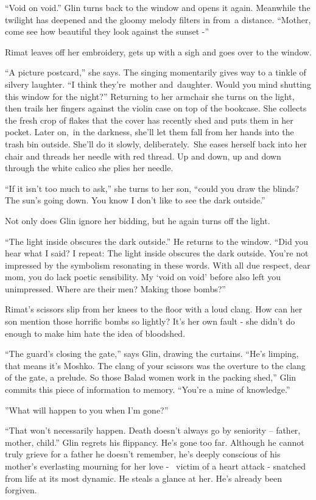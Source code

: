 \documentclass[twoside,11pt]{book}
\begin{document}
``Void on void.'' Glin turns back to the window and opens it
again. Meanwhile the twilight has deepened and the gloomy melody
filters in from~a distance. ``Mother, come see how beautiful they look
against the sunset -''

Rimat leaves off her embroidery, gets up with a sigh and goes over to
the window. 

``A picture postcard,'' she says. The singing momentarily gives way
to a tinkle of silvery laughter. ``I think they're~mother and~daughter. Would you mind shutting this window for the
night?'' Returning
to her armchair she turns on the light, then trails her fingers
against the violin case on top
of the bookcase. She
collects the fresh crop of flakes that the cover has recently shed and
puts them in her pocket. Later on,~in the darkness,
she'll let them fall from her hands into the trash bin
outside. She'll do it slowly, deliberately.~She eases herself back
into her chair and threads her needle with red thread. Up and down, up and down through the white calico she
plies her needle.

``If it isn't
too much to ask,'' she turns to her son,
``could you draw the blinds? The sun's going
down. You know I don't like to see the dark
outside.''

Not only does Glin
ignore her bidding, but he again turns off the light. 

``The light inside obscures
the dark outside.'' He returns to the window. ``Did you hear what I
said? I repeat: The light
inside obscures the dark outside. You're not impressed by the
symbolism resonating in these words. With all due respect, dear mom,
you do lack poetic sensibility. My `void on void' before also left
you unimpressed. Where are their men?
Making those bombs?''

Rimat's scissors slip from her knees to the floor with a loud clang. How can her son mention those horrific bombs so
lightly? It's her own fault - she didn't do enough to make him hate the idea of bloodshed.

``The guard's closing the gate,'' says Glin, drawing the curtains. ``He's limping, that means it's Moshko. The clang
of your scissors was the overture to the clang of the gate, a prelude. So those Balad women work in the packing shed,''
Glin commits this piece of information to memory. ``You're a mine of knowledge.''

''What will happen to you when I'm gone?''

``That won't necessarily happen. Death doesn't always go by seniority -- father, mother, child.'' Glin regrets his
flippancy. He's gone too far. Although he cannot truly grieve for a father he doesn't remember, he's deeply conscious
of his mother's everlasting mourning for her love - \ victim of a heart attack - snatched from life at its most
dynamic. He steals a glance at her. He's already been forgiven.
\end{document}
